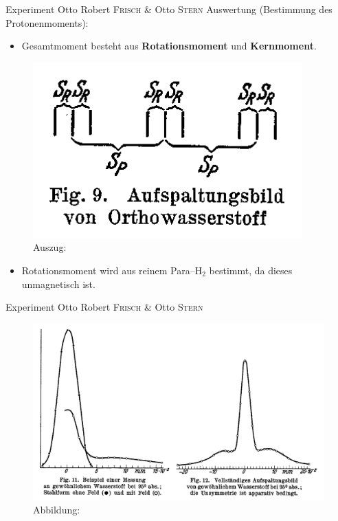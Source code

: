 \documentclass[t,9pt]{beamer}
\begin{document}
        \begin{frame}{Experiment Otto Robert \textsc{Frisch} \& Otto \textsc{Stern}}
                Auswertung (Bestimmung des Protonenmoments):        
                \begin{itemize}
                        \item Gesamtmoment besteht aus \textbf{Rotationsmoment} und \textbf{Kernmoment}.
                \end{itemize}
                \begin{figure}
                        \centering
                        \includegraphics[width=.4\textwidth]{prosi_aufspaltungsbild_orthowasserstoff.png}
                        \caption{Auszug:\cite{FrischStern1933}}
                \end{figure}
                \begin{itemize}
                        \item Rotationsmoment wird aus reinem Para--$\text{H}_2$ bestimmt, da dieses unmagnetisch ist. 
                \end{itemize}
        \end{frame}

        \begin{frame}{Experiment Otto Robert \textsc{Frisch} \& Otto \textsc{Stern}}
                \begin{figure}
                        \centering
                        \includegraphics[width=.9\textwidth]{prosi_frisch_stern_auswertung_graph.png}
                        \caption{Abbildung:\cite{FrischStern1933}}
                \end{figure}
        \end{frame}
\end{document}
